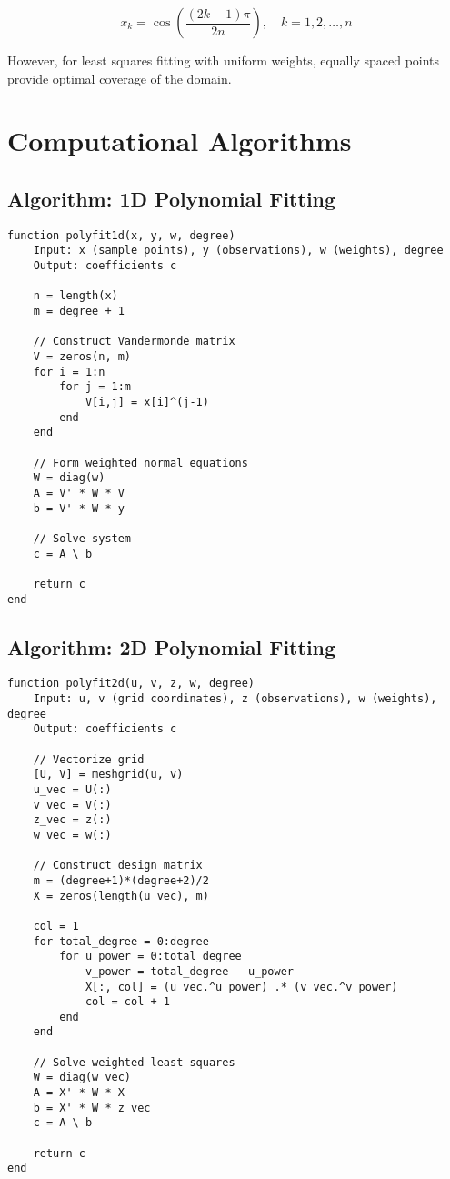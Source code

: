 \documentclass[12pt]{article}
\begin{document}
\begin{equation}
    x_k = \cos\left(\frac{(2k-1)\pi}{2n}\right), \quad k = 1, 2, \ldots, n
\end{equation}

However, for least squares fitting with uniform weights, equally spaced points provide optimal coverage of the domain.

\section{Computational Algorithms}

\subsection{Algorithm: 1D Polynomial Fitting}

\begin{verbatim}
function polyfit1d(x, y, w, degree)
    Input: x (sample points), y (observations), w (weights), degree
    Output: coefficients c
    
    n = length(x)
    m = degree + 1
    
    // Construct Vandermonde matrix
    V = zeros(n, m)
    for i = 1:n
        for j = 1:m
            V[i,j] = x[i]^(j-1)
        end
    end
    
    // Form weighted normal equations
    W = diag(w)
    A = V' * W * V
    b = V' * W * y
    
    // Solve system
    c = A \ b
    
    return c
end
\end{verbatim}

\subsection{Algorithm: 2D Polynomial Fitting}

\begin{verbatim}
function polyfit2d(u, v, z, w, degree)
    Input: u, v (grid coordinates), z (observations), w (weights), degree
    Output: coefficients c
    
    // Vectorize grid
    [U, V] = meshgrid(u, v)
    u_vec = U(:)
    v_vec = V(:)
    z_vec = z(:)
    w_vec = w(:)
    
    // Construct design matrix
    m = (degree+1)*(degree+2)/2
    X = zeros(length(u_vec), m)
    
    col = 1
    for total_degree = 0:degree
        for u_power = 0:total_degree
            v_power = total_degree - u_power
            X[:, col] = (u_vec.^u_power) .* (v_vec.^v_power)
            col = col + 1
        end
    end
    
    // Solve weighted least squares
    W = diag(w_vec)
    A = X' * W * X
    b = X' * W * z_vec
    c = A \ b
    
    return c
end
\end{verbatim}
\end{document}
